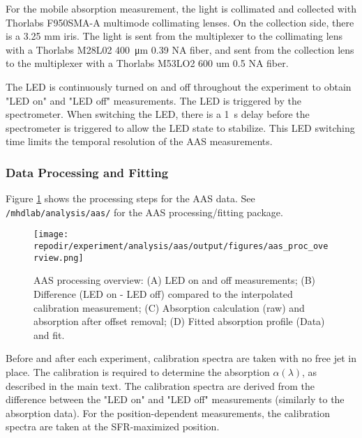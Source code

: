 For the mobile absorption measurement, the light is collimated and collected with Thorlabs F950SMA-A multimode collimating lenses. On the collection side, there is a 3.25  mm iris. The light is sent from the multiplexer to the collimating lens with a Thorlabs M28L02 \SI{400} {\micro\meter} 0.39 NA fiber, and sent from the collection lens to the multiplexer with a Thorlabs M53LO2 600 um 0.5 NA fiber. 

The LED is continuously turned on and off throughout the experiment to obtain "LED on" and "LED off" measurements. The LED is triggered by the spectrometer. When switching the LED, there is a \SI{1} {\second} delay before the spectrometer is triggered to allow the LED state to stabilize. This LED switching time limits the temporal resolution of the AAS measurements. 

\subsubsection{Data Processing and Fitting}

Figure \ref{fig:SI_AAS_proc_overview} shows the processing steps for the AAS data.
See \texttt{/mhdlab/analysis/aas/} for the AAS processing/fitting package. 


\begin{figure}[]
    \centering
    \texttt{[image: \\repodir/experiment/analysis/aas/output/figures/aas\_proc\_overview.png]}
    \caption{AAS processing overview: (A) LED on and off measurements; (B) Difference (LED on - LED off) compared to the interpolated calibration measurement; (C) Absorption calculation (raw) and absorption after offset removal; (D) Fitted absorption profile (Data) and fit.}
    \label{fig:SI_AAS_proc_overview}
\end{figure}


Before and after each experiment, calibration spectra are taken with no free jet in place. The calibration is required to determine the absorption $\alpha(\lambda)$, as described in the main text.  The calibration spectra are derived from the difference between the "LED on" and "LED off" measurements (similarly to the absorption data). For the position-dependent measurements, the calibration spectra are taken at the SFR-maximized position. 


